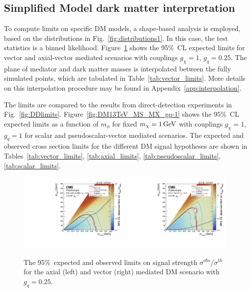 \clearpage
\subsection{Simplified Model dark matter interpretation} 

To compute limits on specific DM models, a shape-based analysis is
employed, based on the \ETm distributions in
Fig.~\ref{fig:distributions1}. 
In this case, the test statistics is a binned likelihood. 
Figure~\ref{fig:DM13TeV_MV_MX_gq-0p25} shows the 95\%~CL expected limits for vector and axial-vector mediated scenarios with couplings $g_\chi=1$, $g_q=0.25$.
The plane of mediator and dark matter masses is interpolated between the fully simulated points, which are tabulated in Table~\ref{tab:vector_limits}.
More details on this interpolation procedure may be found in Appendix~\ref{app:interpolation}.

The limits are compared to the results from direct-detection experiments in Fig.~\ref{fig:DDlimits}.
Figure~\ref{fig:DM13TeV_MS_MX_gq-1} shows the 95\%~CL expected limits as a function of $m_{\phi}$ for fixed $m_{\chi}=1\,\text{Ge\hspace{-.08em}V}$ with
couplings $g_\chi=1$, $g_q=1$ for scalar and pseudoscalar-vector mediated scenarios.
The expected and observed cross section limits for the different DM signal hypotheses are shown in
Tables~\ref{tab:vector_limits}, \ref{tab:axial_limits}, \ref{tab:pseudoscalar_limits}, \ref{tab:scalar_limits}.

\begin{figure}[hbtp]
  \centering
   \includegraphics[width=0.48\textwidth]{figures/limit_axial_cl95.pdf}
   \includegraphics[width=0.48\textwidth]{figures/limit_vector_cl95.pdf}
  \caption{
    The 95\%~\CL expected and observed limits on signal strength $\sigma^{obs}/\sigma^{th}$
    for the axial (left) and vector (right) mediated DM scenario with $g_{q}=0.25$.
  } 
  \label{fig:DM13TeV_MV_MX_gq-0p25}
\end{figure}

